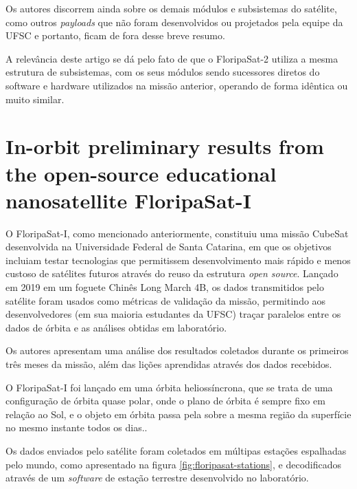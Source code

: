 Os autores discorrem ainda sobre os demais módulos e subsistemas do satélite, como outros \textit{payloads} que não foram desenvolvidos ou projetados pela equipe da UFSC e portanto, ficam de fora desse breve resumo.

A relevância deste artigo se dá pelo fato de que o FloripaSat-2 utiliza a mesma estrutura de subsistemas, com os seus módulos sendo sucessores diretos do software e hardware utilizados na missão anterior, operando de forma idêntica ou muito similar.


\section{In-orbit preliminary results from the open-source educational nanosatellite FloripaSat-I \texorpdfstring{\\\cite{marcelino2021}}{} }
\label{relacionados:marcelino2021}
O FloripaSat-I, como mencionado anteriormente, constituiu uma missão CubeSat desenvolvida na Universidade Federal de Santa Catarina, em que os objetivos incluiam testar tecnologias que permitissem desenvolvimento mais rápido e menos custoso de satélites futuros através do reuso da estrutura \textit{open source}. Lançado em 2019 em um foguete Chinês Long March 4B, os dados transmitidos pelo satélite foram usados como métricas de validação da missão, permitindo aos desenvolvedores (em sua maioria estudantes da UFSC) traçar paralelos entre os dados de órbita e as análises obtidas em laboratório.

Os autores apresentam uma análise dos resultados coletados durante os primeiros três meses da missão, além das lições aprendidas através dos dados recebidos.

O FloripaSat-I foi lançado em uma órbita heliossíncrona, que se trata de uma configuração de órbita quase polar, onde o plano de órbita é sempre fixo em relação ao Sol, e o objeto em órbita passa pela sobre a mesma região da superfície no mesmo instante todos os dias.\cite{tscherbakova-1998}.

Os dados enviados pelo satélite foram coletados em múltipas estações espalhadas pelo mundo, como apresentado na figura \autoref{fig:floripasat-stations}, e decodificados através de um \textit{software} de estação terrestre desenvolvido no laboratório.

